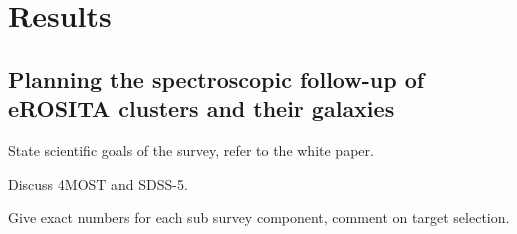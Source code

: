\documentclass[fleqn,usenatbib,onecolumn]{mnras}
\begin{document}
% 
% 
% 
% 
% 
% 
% 
% 
% 
% 

\section{Results}
\label{sec:results}

\subsection{Planning the spectroscopic follow-up of eROSITA clusters and their galaxies}

State scientific goals of the survey, refer to the white paper. 

Discuss 4MOST and SDSS-5. \citep{Kollmeier17,Finoguenov2019Msngr}

Give exact numbers for each sub survey component, comment on target selection.
\end{document}
